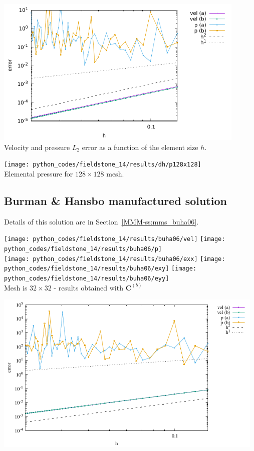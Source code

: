 \begin{center}
\includegraphics[width=12cm]{python_codes/fieldstone_14/results/dh/errors.pdf}\\
{\captionfont Velocity and pressure $L_2$ error as a function of the element size $h$.}
\end{center}


\begin{center}
\texttt{[image: python\_codes/fieldstone\_14/results/dh/p128x128]}\\
{\captionfont Elemental pressure for $128\times 128$ mesh.}
\end{center}

\newpage
\subsection*{Burman \& Hansbo manufactured solution}

Details of this solution are in Section~\ref{MMM-ss:mms_buha06}.


\begin{center}
\texttt{[image: python\_codes/fieldstone\_14/results/buha06/vel]}
\texttt{[image: python\_codes/fieldstone\_14/results/buha06/p]}\\
\texttt{[image: python\_codes/fieldstone\_14/results/buha06/exx]}
\texttt{[image: python\_codes/fieldstone\_14/results/buha06/exy]}
\texttt{[image: python\_codes/fieldstone\_14/results/buha06/eyy]}\\
{\captionfont Mesh is $32\times 32$ - results obtained with ${\bm C}^{(b)}$}
\end{center}


\begin{center}
\includegraphics[width=13cm]{python_codes/fieldstone_14/results/buha06/errors.pdf}
\end{center}

